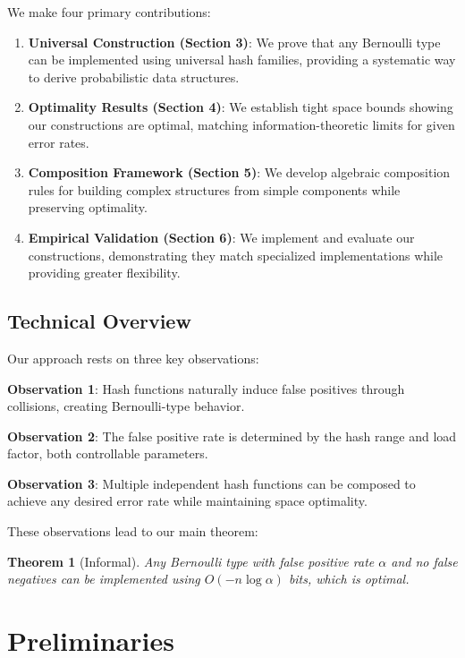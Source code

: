 \documentclass[11pt]{article}
\newtheorem{theorem}{Theorem}
\begin{document}
We make four primary contributions:

\begin{enumerate}
\item \textbf{Universal Construction (Section 3)}: We prove that any Bernoulli type can be implemented using universal hash families, providing a systematic way to derive probabilistic data structures.

\item \textbf{Optimality Results (Section 4)}: We establish tight space bounds showing our constructions are optimal, matching information-theoretic limits for given error rates.

\item \textbf{Composition Framework (Section 5)}: We develop algebraic composition rules for building complex structures from simple components while preserving optimality.

\item \textbf{Empirical Validation (Section 6)}: We implement and evaluate our constructions, demonstrating they match specialized implementations while providing greater flexibility.
\end{enumerate}

\subsection{Technical Overview}

Our approach rests on three key observations:

\textbf{Observation 1}: Hash functions naturally induce false positives through collisions, creating Bernoulli-type behavior.

\textbf{Observation 2}: The false positive rate is determined by the hash range and load factor, both controllable parameters.

\textbf{Observation 3}: Multiple independent hash functions can be composed to achieve any desired error rate while maintaining space optimality.

These observations lead to our main theorem:

\begin{theorem}[Informal]
Any Bernoulli type with false positive rate $\alpha$ and no false negatives can be implemented using $O(-n\log \alpha)$ bits, which is optimal.
\end{theorem}

\section{Preliminaries}
\end{document}
